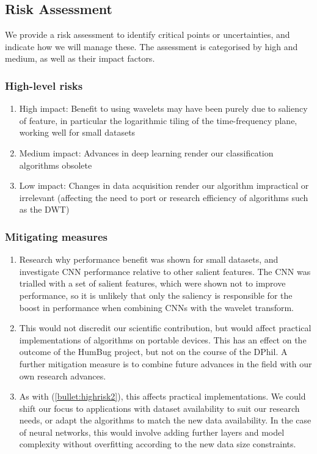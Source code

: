 \documentclass[12pt]{llncs}
\begin{document}
\subsection{Risk Assessment}
We provide a risk assessment to identify critical points or uncertainties, and indicate how we will manage these. The assessment is categorised by high and medium, as well as their impact factors.

\subsubsection{High-level risks} 
\begin{enumerate} 
\item High impact: Benefit to using wavelets may have been purely due to saliency of feature, in particular the logarithmic tiling of the time-frequency plane, working well for small datasets
\item Medium impact: Advances in deep learning render our classification algorithms obsolete
\label{bullet:highrisk2}
\item Low impact: Changes in data acquisition render our algorithm impractical or irrelevant (affecting the need to port or research efficiency of algorithms such as the DWT)


\end{enumerate}


\subsubsection{Mitigating measures}
\begin{enumerate} 
    \item Research why performance benefit was shown for small datasets, and investigate CNN performance relative to other salient features. The CNN was trialled with a set of salient features, which were shown not to improve performance, so it is unlikely that only the saliency is responsible for the boost in performance when combining CNNs with the wavelet transform.
    \item This would not discredit our scientific contribution, but would affect practical implementations of algorithms on portable devices. This has an effect on the outcome of the HumBug project, but not on the course of the DPhil. A further mitigation measure is to combine future advances in the field with our own research advances.
	\item As with (\ref{bullet:highrisk2}), this affects practical implementations. We could shift our focus to applications with dataset availability to suit our research needs, or adapt the algorithms to match the new data availability. In the case of neural networks, this would involve adding further layers and model complexity without overfitting according to the new data size constraints.

\end{enumerate}
\end{document}
